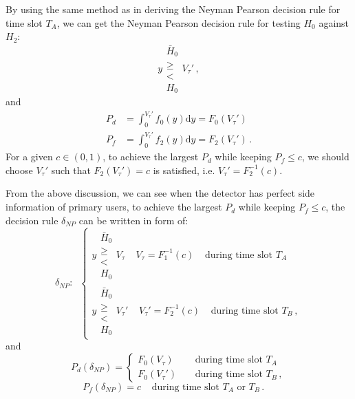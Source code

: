 By using the same method as in deriving the Neyman Pearson decision rule for time slot $T_A$, we can get the Neyman Pearson decision rule for testing $H_0$ against $H_2$:
\begin{equation}
  y  \substack{\bar{H}_0 \\ \geq \\ < \\ H_0} V_\tau'\,,
  \label{20150628a0}
\end{equation}
and  
\begin{equation}
  \begin{split}
  P_d &= \int_{0}^{V_\tau'} f_0(y) \mathrm{d}y = F_0(V_\tau')\\
  P_f &= \int_{0}^{V_\tau'} f_2(y) \mathrm{d}y= F_2(V_\tau')\,.
    \end{split}
    \label{20150628a1}
  \end{equation}
For a given $c \in (0, 1)$, to achieve the largest  $P_d$ while keeping $P_f \leq c$, we should choose $V_\tau'$ such that $F_2(V_\tau') = c$ is satisfied, i.e. $V_\tau' = F^{-1}_2(c)$. 

From the above discussion, we can see when the detector has perfect side information of primary users, to achieve the largest $P_d$ while keeping $P_f \leq c$, the decision rule $\delta_{NP}$ can be written in form of:
\begin{equation}
  \delta_{NP}:\;\;
\begin{cases}
 y  \substack{\bar{H}_0 \\ \geq \\ < \\ H_0} V_\tau\;\;\;\;V_\tau = F_1^{-1}(c)\;\;\;\;\text{during time slot $T_A$}\\
y  \substack{\bar{H}_0 \\ \geq \\ < \\ H_0} V_\tau'\;\;\;\;V_\tau' = F_2^{-1}(c)\;\;\;\;\text{during time slot $T_B$}\,,
\end{cases}
\label{20150702b1}
\end{equation}
and 
\begin{equation}
  P_d(\delta_{NP}) = \begin{cases}
    F_0(V_\tau)\;\;\;\;&\text{during time slot $T_A$}\\
    F_0(V_\tau')\;\;\;\;&\text{during time slot $T_B$}\,,
  \end{cases}
  \label{20150702b2}
\end{equation} 
\begin{equation}
  P_f(\delta_{NP}) = c\;\;\;\;\text{during time slot $T_A$ or $T_B$}\,.\;\;\;\;
\end{equation}

